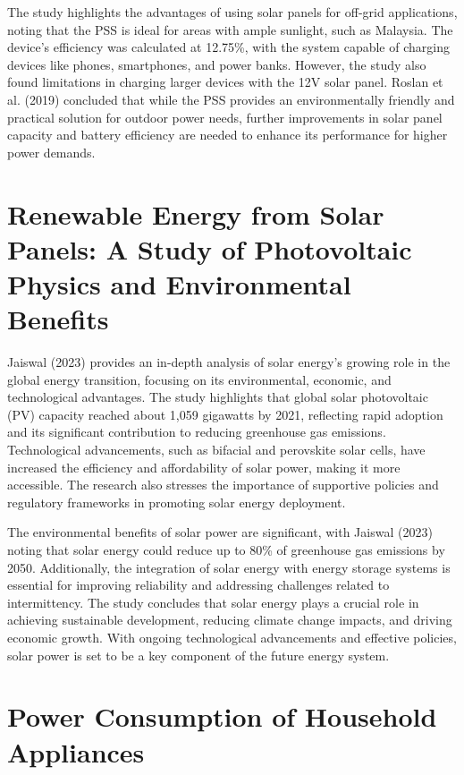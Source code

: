 {The study highlights the advantages of using solar panels for off-grid applications, noting that the PSS is ideal for areas with ample sunlight, such as Malaysia. The device’s efficiency was calculated at 12.75\%, with the system capable of charging devices like phones, smartphones, and power banks. However, the study also found limitations in charging larger devices with the 12V solar panel. Roslan et al. (2019) concluded that while the PSS provides an environmentally friendly and practical solution for outdoor power needs, further improvements in solar panel capacity and battery efficiency are needed to enhance its performance for higher power demands.

\section{Renewable Energy from Solar Panels: A Study of  Photovoltaic Physics and Environmental Benefits}

Jaiswal (2023) provides an in-depth analysis of solar energy’s growing role in the global energy transition, focusing on its environmental, economic, and technological advantages. The study highlights that global solar photovoltaic (PV) capacity reached about 1,059 gigawatts by 2021, reflecting rapid adoption and its significant contribution to reducing greenhouse gas emissions. Technological advancements, such as bifacial and perovskite solar cells, have increased the efficiency and affordability of solar power, making it more accessible. The research also stresses the importance of supportive policies and regulatory frameworks in promoting solar energy deployment.

The environmental benefits of solar power are significant, with Jaiswal (2023) noting that solar energy could reduce up to 80\% of greenhouse gas emissions by 2050. Additionally, the integration of solar energy with energy storage systems is essential for improving reliability and addressing challenges related to intermittency. The study concludes that solar energy plays a crucial role in achieving sustainable development, reducing climate change impacts, and driving economic growth. With ongoing technological advancements and effective policies, solar power is set to be a key component of the future energy system.

\section{Power Consumption of Household Appliances }

}
